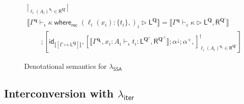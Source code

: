 \documentclass[acmsmall,screen,review]{acmart}
\newcommand{\mc}[1]{\ensuremath{\mathcal{#1}}}
\newcommand{\mb}[1]{\ensuremath{\mathbf{#1}}}
\newcommand{\ms}[1]{\ensuremath{\mathsf{#1}}}
\newcommand{\lto}{:}
\newcommand{\cwhere}[2]{#1\;\ms{where}_{\ms{rec}}\;#2}
\newcommand{\wbranch}[3]{#1(#2) \lto \{#3\}}
\newcommand{\hasty}[4]{#1 \vdash_{#2} #3: {#4}}
\newcommand{\haslb}[4]{#1 \vdash_{#2} #3 \rhd #4}
\newcommand{\tref}{\twoheadrightarrow}
\newcommand{\lbref}[5]{#1 \vdash_{#2} #3 \tref #4 \rhd {#5}}
\newcommand{\ltoty}[2]{[#1 \mapsto #2]}
\newcommand{\dnt}[1]{\llbracket{#1}\rrbracket}
\newcommand{\subiterexp}{\texorpdfstring{\(\lambda_{\ms{iter}}\)}{lambda-iter}}
\newcommand{\isotopessa}{\(\lambda_{\ms{SSA}}\)}
\newcommand{\zeroqv}[1]{#1^\uparrow}
\begin{document}
\begin{figure}
\begin{adjustbox}{minipage=1.1\textwidth,scale=0.9}
\begin{gather*}
      ]_{\ell_i(A_i)^{\mb{q}_i} \in \ms{R}^{\mb{Q}'}}
    ]
    \\
    \dnt
    {\haslb{\Gamma^{\mb{q}}}{\epsilon}{\cwhere{\kappa}{(\wbranch{\ell_i}{x_i}{t_i},)_i}}
      {\ms{L}^{\mb{Q}}}}
    = \dnt{\haslb{\Gamma^{\mb{q}}}{\epsilon}{\kappa}
      {\ms{L}^{\mb{Q}}, \ms{R}^{\mb{Q}'}}}
    \\
    \qquad ; [
      \ms{id}_{\dnt{\ltoty{\Gamma}{\ms{L}^{\mb{Q}}}}},
      [
        \dnt{\hasty{\Gamma^{\mb{q}_i}, x_i : A_i}{\epsilon}{t_i}
          {\ms{L}^{\zeroqv{\mb{Q}}}, \ms{R}^{\zeroqv{\mb{Q}'}}}} ; \alpha^\downarrow ; \alpha^+,
      ]_{\ell_i(A_i)^{\mb{q}_i} \in \ms{R}^{\mb{Q}'}}^\dagger
    ]
  \end{gather*}
  \end{adjustbox}
  \caption{Denotational semantics for \isotopessa{}}
  \Description{}
  \label{fig:ssa-densem}
\end{figure}

\subsection{Interconversion with \subiterexp{}}
\label{ssec:interconversion}

\end{document}
